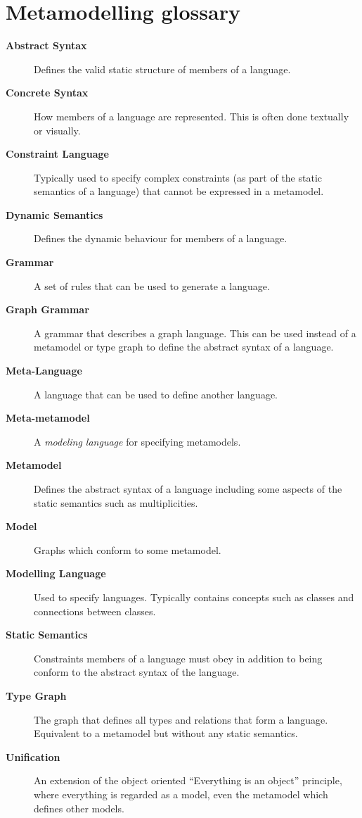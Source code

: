 \newpage
\chapter{Metamodelling glossary}

\begin{description}

\item[\bf Abstract Syntax] 
Defines the valid static structure of members of a language. 

\item[\bf Concrete Syntax]
How members of a language are represented. This is often done textually or visually.

\item[\bf Constraint Language] 
Typically used to specify complex constraints (as part of the static semantics of a language) that cannot be expressed in a metamodel.

\item[\bf Dynamic Semantics] 
Defines the dynamic behaviour for members of a language.

\item[\bf Grammar] 
A set of rules that can be used to generate a language. 

\item[\bf Graph Grammar] 
A grammar that describes a graph language. This can be used instead of a metamodel or type graph to define the abstract syntax of a language.

\item[\bf Meta-Language] 
A language that can be used to define another language.

\item[\bf Meta-metamodel] 
A \emph{modeling language} for specifying metamodels.

\item[\bf Metamodel] 
Defines the abstract syntax of a language including some aspects of the static semantics such as multiplicities. 

\item[\bf Model] 
Graphs which conform to some metamodel.

\item[\bf Modelling Language] 
Used to specify languages. Typically contains concepts such as classes and connections between classes.

\item[\bf Static Semantics] 
Constraints members of a language must obey in addition to being conform to the abstract syntax of the language.

\item[\bf Type Graph] 
The graph that defines all types and relations that form a language. Equivalent to a metamodel but without any static semantics.

\item[\bf Unification]  
An extension of the object oriented ``Everything is an object'' principle, where everything is regarded as a model, even the metamodel which defines other
models.

\end{description}

